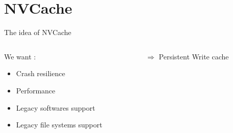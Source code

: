 \documentclass[presentation]{beamer}
\begin{document}
\section{NVCache}
\label{sec:orgf97561b}

\begin{frame}[label={sec:orgfc880c1}]{The idea of NVCache}
\begin{columns}
\begin{column}{0.5\columnwidth}
\begin{block}{We want :}
\begin{itemize}
\item Crash resilience\pause\\

\item Performance\pause\\

\item Legacy softwares support\pause\\

\item Legacy file systems support\pause\\
\end{itemize}
\end{block}
\end{column}

\begin{column}{0.5\columnwidth}
\begin{block}{\(\Rightarrow\) Persistent Write cache}
\end{block}
\end{column}
\end{columns}
\end{frame}
\end{document}
